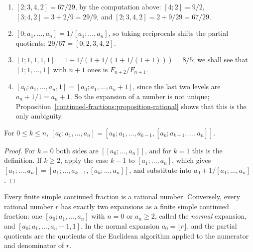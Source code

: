 \begin{example}\label{continued-fractions:example-first}
\begin{enumerate}
\item $[2; 3, 4, 2] = 67/29$, by the computation above: $[4; 2] = 9/2$, $[3; 4, 2] = 3 + 2/9 = 29/9$, and $[2; 3, 4, 2] = 2 + 9/29 = 67/29$.
\item $[0; a_1, \ldots, a_n] = 1/[a_1; \ldots, a_n]$, so taking reciprocals shifts the partial quotients: $29/67 = [0; 2, 3, 4, 2]$.
\item $[1; 1, 1, 1, 1] = 1 + 1/(1 + 1/(1 + 1/(1 + 1))) = 8/5$; we shall see that $[1; 1, \ldots, 1]$ with $n + 1$ ones is $F_{n+2}/F_{n+1}$.
\item $[a_0; a_1, \ldots, a_n, 1] = [a_0; a_1, \ldots, a_n + 1]$, since the last two levels are $a_n + 1/1 = a_n + 1$. So the expansion of a number is not unique;
Proposition~\ref{continued-fractions:proposition-rational} shows that this is the only ambiguity.
\end{enumerate}
\end{example}

\begin{lemma}\label{continued-fractions:lemma-splitting}
For $0 \leq k \leq n$, $[a_0; a_1, \ldots, a_n] = [a_0; a_1, \ldots, a_{k-1}, [a_k; a_{k+1}, \ldots, a_n]]$.
\end{lemma}

\begin{proof}
For $k = 0$ both sides are $[[a_0; \ldots, a_n]]$, and for $k = 1$ this is the definition. If $k \geq 2$, apply the case $k - 1$ to $[a_1; \ldots, a_n]$, which gives
$[a_1; \ldots, a_n] = [a_1; \ldots, a_{k-1}, [a_k; \ldots, a_n]]$, and substitute into $a_0 + 1/[a_1; \ldots, a_n]$.
\end{proof}

\begin{proposition}\label{continued-fractions:proposition-rational}
Every finite simple continued fraction is a rational number. Conversely, every rational number $r$ has exactly two expansions as a finite simple continued fraction: one
$[a_0; a_1, \ldots, a_n]$ with $n = 0$ or $a_n \geq 2$, called the \emph{normal} expansion, and $[a_0; a_1, \ldots, a_n - 1, 1]$. In the normal expansion $a_0 = \lfloor r \rfloor$, and the partial
quotients are the quotients of the Euclidean algorithm applied to the numerator and denominator of $r$.
\end{proposition}

